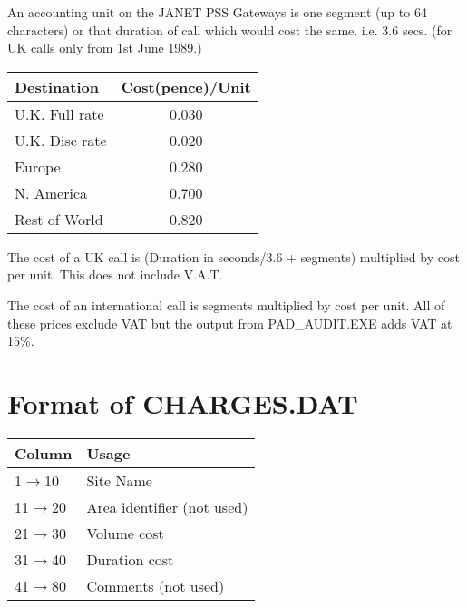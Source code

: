  An accounting unit on the JANET PSS Gateways is one segment (up  to  64
 characters) or  that  duration of call which would cost the same.  i.e.
 3.6 secs.  (for UK calls only from 1st June 1989.)

\begin{table}[h]
\begin{center}
\begin{tabular} {||l|c||}
\hline
Destination    & Cost(pence)/Unit \\
\hline
U.K. Full rate    &       0.030 \\
U.K. Disc rate    &       0.020 \\
Europe            &       0.280 \\
N. America        &       0.700 \\
Rest of World     &       0.820 \\
\hline
\end{tabular}
\end{center}
\end{table}

The cost of a UK call is
(Duration in seconds/3.6 + segments) multiplied by cost per unit.  This
does not include V.A.T.

The cost of an international call is segments multiplied  by  cost  per
unit.
All of these prices  exclude VAT but the output from PAD\_\/AUDIT.EXE adds
VAT at 15\%.

\newpage

\section {Format of CHARGES.DAT }
\begin{table}[htb]
\begin{center}
\begin{tabular} {||l|l||}
\hline
Column   & Usage \\
\hline
 1$\rightarrow$10           &       Site Name                   \\
11$\rightarrow$20           &       Area identifier (not used)  \\
21$\rightarrow$30           &       Volume cost                 \\
31$\rightarrow$40           &       Duration cost               \\
41$\rightarrow$80           &       Comments (not used)         \\
\hline
\end{tabular}
\end{center}
\end{table}

